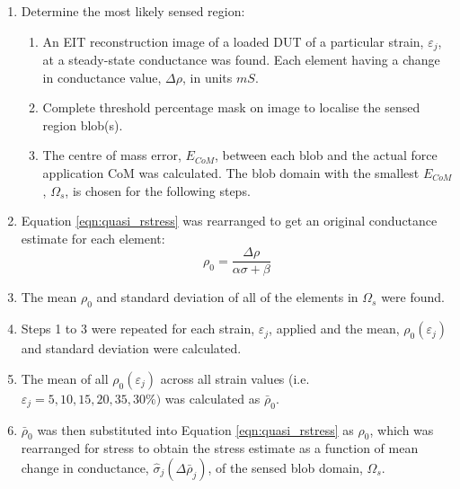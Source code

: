 \begin{enumerate}
    \item Determine the most likely sensed region:
    \begin{enumerate}
        \item An EIT reconstruction image of a loaded DUT of a particular strain, $\varepsilon_j$, at a steady-state conductance was found. Each element having a change in conductance value, $\Delta\rho$, in units $mS$.
        \item Complete threshold percentage mask on image to localise the sensed region blob(s).
        \item The centre of mass error, $E_{CoM}$, between each blob and the actual force application CoM was calculated. The blob domain with the smallest $E_{CoM}$, $\Omega_s$, is chosen for the following steps.
    \end{enumerate}
    \item Equation \ref{eqn:quasi_rstress} was rearranged to get an original conductance estimate for each element:
    \begin{equation}
        \rho_0 = \frac{\Delta \rho}{\alpha \sigma+\beta}
        \label{eqn:C0_est_stress}
    \end{equation}
    \item The mean $\rho_0$ and standard deviation of all of the elements in $\Omega_s$ were found.
    \item Steps 1 to 3 were repeated for each strain, $\varepsilon_j$, applied and the mean, $\rho_0(\varepsilon_j)$ and standard deviation  were calculated.
    \item The mean of all $\rho_0(\varepsilon_j)$ across all strain values (i.e. $\varepsilon_j = 5, 10, 15, 20, 35, 30\%)$ was calculated as $\bar\rho_0$.
    \item $\bar\rho_0$ was then substituted into Equation \ref{eqn:quasi_rstress} as $\rho_0$, which was rearranged for stress to obtain the stress estimate as a function of mean change in conductance, $\hat\sigma_j(\Delta \bar\rho_j)$, of the sensed blob domain, $\Omega_s$.
\end{enumerate}


